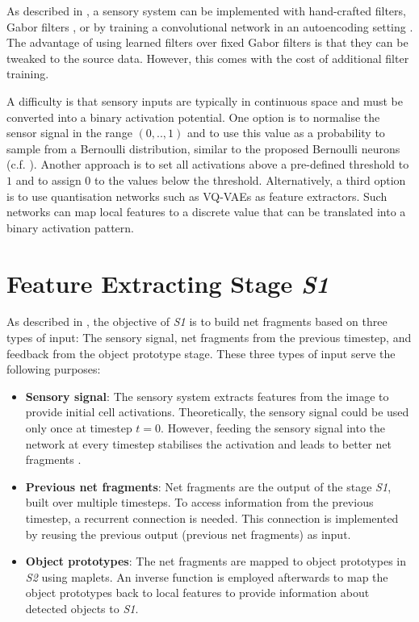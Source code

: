 As described in , a sensory system can be implemented with hand-crafted filters, Gabor filters , or by training a convolutional network in an autoencoding setting . The advantage of using learned filters over fixed Gabor filters is that they can be tweaked to the source data. However, this comes with the cost of additional filter training.

A difficulty is that sensory inputs are typically in continuous space and must be converted into a binary activation potential.
One option is to normalise the sensor signal in the range $(0, .., 1)$ and to use this value as a probability to sample from a Bernoulli distribution, similar to the proposed Bernoulli neurons (c.f. ).
Another approach is to set all activations above a pre-defined threshold to $1$ and to assign 0 to the values below the threshold.
Alternatively, a third option is to use quantisation networks such as VQ-VAEs  as feature extractors. Such networks can map local features to a discrete value that can be translated into a binary activation pattern.


\section{Feature Extracting Stage \emph{S1}}
As described in , the objective of \emph{S1} is to build net fragments based on three types of input: The sensory signal, net fragments from the previous timestep, and feedback from the object prototype stage.
These three types of input serve the following purposes:
\begin{itemize}
    \item \textbf{Sensory signal}: The sensory system extracts features from the image to provide initial cell activations. Theoretically, the sensory signal could be used only once at timestep $t=0$. However, feeding the sensory signal into the network at every timestep stabilises the activation and leads to better net fragments .
    \item \textbf{Previous net fragments}: Net fragments are the output of the stage \emph{S1}, built over multiple timesteps.
    To access information from the previous timestep, a recurrent connection is needed. This connection is implemented by reusing the previous output (previous net fragments) as input.
    \item \textbf{Object prototypes}: The net fragments are mapped to object prototypes in \emph{S2} using maplets. An inverse function is employed afterwards to map the object prototypes back to local features to provide information about detected objects to \emph{S1}.
\end{itemize}

